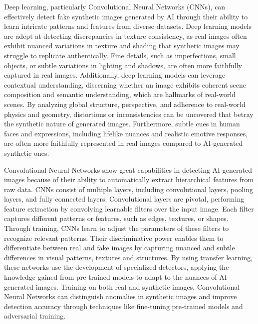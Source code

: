 Deep learning, particularly Convolutional Neural Networks (CNNs), can effectively detect fake synthetic images generated by AI through their ability to learn intricate patterns and features from diverse datasets. Deep learning models are adept at detecting discrepancies in texture consistency, as real images often exhibit nuanced variations in texture and shading that synthetic images may struggle to replicate authentically. Fine details, such as imperfections, small objects, or subtle variations in lighting and shadows, are often more faithfully captured in real images. Additionally, deep learning models can leverage contextual understanding, discerning whether an image exhibits coherent scene composition and semantic understanding, which are hallmarks of real-world scenes. By analyzing global structure, perspective, and adherence to real-world physics and geometry, distortions or inconsistencies can be uncovered that betray the synthetic nature of generated images. Furthermore, subtle cues in human faces and expressions, including lifelike nuances and realistic emotive responses, are often more faithfully represented in real images compared to AI-generated synthetic ones.

Convolutional Neural Networks show great capabilities in detecting AI-generated images because of their ability to automatically extract hierarchical features from raw data. CNNs consist of multiple layers, including convolutional layers, pooling layers, and fully connected layers. Convolutional layers are pivotal, performing feature extraction by convolving learnable filters over the input image. Each filter captures different patterns or features, such as edges, textures, or shapes. Through training, CNNs learn to adjust the parameters of these filters to recognize relevant patterns. Their discriminative power enables them to differentiate between real and fake images by capturing nuanced and subtle differences in visual patterns, textures and structures. By using transfer learning, these networks use the development of specialized detectors, applying the knowledge gained from pre-trained models to adapt to the nuances of AI-generated images. Training on both real and synthetic images, Convolutional Neural Networks can distinguish anomalies in synthetic images and improve detection accuracy through techniques like fine-tuning pre-trained models and adversarial training. 

